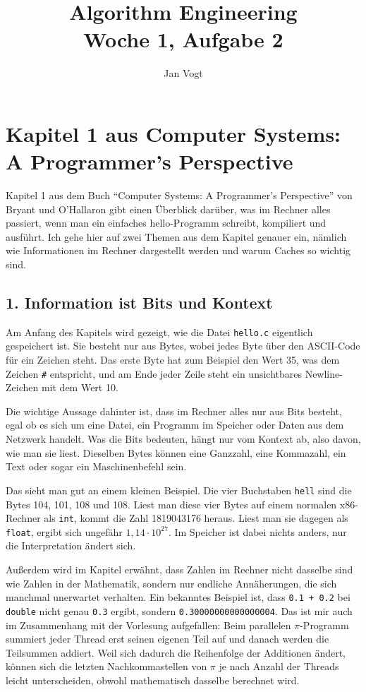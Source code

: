 \documentclass[11pt]{article}
\title{Algorithm Engineering\\Woche 1, Aufgabe 2}
\author{Jan Vogt}
\date{}
\begin{document}
\maketitle

\section*{Kapitel 1 aus Computer Systems: A Programmer's Perspective}

Kapitel 1 aus dem Buch "`Computer Systems: A Programmer's Perspective"' von Bryant und O'Hallaron
gibt einen Überblick darüber, was im Rechner alles passiert, wenn man ein einfaches hello-Programm
schreibt, kompiliert und ausführt. Ich gehe hier auf zwei Themen aus dem Kapitel genauer ein,
nämlich wie Informationen im Rechner dargestellt werden und warum Caches so wichtig sind.

\subsection*{1. Information ist Bits und Kontext}

Am Anfang des Kapitels wird gezeigt, wie die Datei \texttt{hello.c} eigentlich gespeichert ist.
Sie besteht nur aus Bytes, wobei jedes Byte über den ASCII-Code für ein Zeichen steht. Das erste
Byte hat zum Beispiel den Wert 35, was dem Zeichen \texttt{\#} entspricht, und am Ende jeder Zeile
steht ein unsichtbares Newline-Zeichen mit dem Wert 10.

Die wichtige Aussage dahinter ist, dass im Rechner alles nur aus Bits besteht, egal ob es sich um
eine Datei, ein Programm im Speicher oder Daten aus dem Netzwerk handelt. Was die Bits bedeuten,
hängt nur vom Kontext ab, also davon, wie man sie liest. Dieselben Bytes können eine Ganzzahl, eine
Kommazahl, ein Text oder sogar ein Maschinenbefehl sein.

Das sieht man gut an einem kleinen Beispiel. Die vier Buchstaben \texttt{hell} sind
die Bytes 104, 101, 108 und 108. Liest man diese vier Bytes auf einem normalen x86-Rechner als
\texttt{int}, kommt die Zahl 1819043176 heraus. Liest man sie dagegen als \texttt{float}, ergibt
sich ungefähr $1{,}14 \cdot 10^{27}$. Im Speicher ist dabei nichts anders, nur die Interpretation
ändert sich.

Außerdem wird im Kapitel erwähnt, dass Zahlen im Rechner nicht dasselbe sind wie Zahlen in der
Mathematik, sondern nur endliche Annäherungen, die sich manchmal unerwartet verhalten. Ein
bekanntes Beispiel ist, dass \texttt{0.1 + 0.2} bei \texttt{double} nicht genau \texttt{0.3}
ergibt, sondern \texttt{0.30000000000000004}. Das ist mir auch im Zusammenhang mit der Vorlesung
aufgefallen: Beim parallelen $\pi$-Programm summiert jeder Thread erst seinen eigenen Teil auf und
danach werden die Teilsummen addiert. Weil sich dadurch die Reihenfolge der Additionen ändert,
können sich die letzten Nachkommastellen von $\pi$ je nach Anzahl der Threads leicht
unterscheiden, obwohl mathematisch dasselbe berechnet wird.
\end{document}
